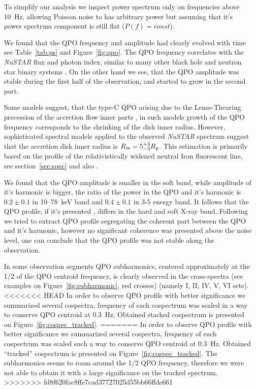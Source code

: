 \documentclass[a4paper,fleqn,usenatbib]{mnras}
\begin{document}
To simplify our analysis we inspect power spectrum only on frequencies above 10~Hz, allowing Poisson noise to has arbitrary power but assuming that it's power spectrum component is still flat ($P(f) = const$).

We found that the QPO frequency and amplitude had clearly evolved with time see Table~\ref{tab:ps} and Figure~\ref{fig:qpo}.
The QPO frequency correlates with the {\it NuSTAR} flux and photon index, similar to many other black hole and neutron star binary systems \citep[see, e.g.,][]{2003A&A...397..729V,2003A&A...407.1039P}.
On the other hand we see, that the QPO amplitude was stable during the first half of the observation, and started to grow in the second part.

Some models suggest, that the type-C QPO arising due to the Lense-Thearing precession of the accretion flow inner parts \citep{1998ApJ...492L..59S, 2006ApJ...642..420S, 2009MNRAS.397L.101I}, in such models growth of the QPO frequency corresponds to the shrinking of the disk inner radius.
However, sophisticated spectral models applied to the observed {\it NuSTAR} spectrum suggest that the accretion disk inner radius is $R_{\rm in}= 5_{-3}^{+3}R_{\rm g}$.
This estimation is primarily based on the profile of the relativistically widened neutral Iron fluorescent line, see section~\ref{sec:spec} and also \citep{miller15_nust}.

We found that the QPO amplitude is smaller in the soft band, while amplitude of it's harmonic is bigger, the ratio of the power in the QPO and it's harmonic is $0.2\pm0.1$ in 10--78~keV band and $0.4\pm0.1$ in 3-5 energy band.
It follows that the QPO profile, if it's presented \citep[see, e.g.][]{2015MNRAS.446.3516I}, differs in the hard and soft X-ray band.
Following \citep{2015MNRAS.446.3516I} we tried to extract  QPO profile segregating the coherent part between the QPO and it's harmonic, however no significant coherence was presented above the noise level, one can conclude that the QPO profile was not stable along the observation. 

In some observation segments QPO subharmonics, centered approximately at the 1/2 of the QPO centroid frequency, is clearly observed in the cross-spectra (see examples on Figure~\ref{fig:subharmonic}, red crosses) (namely I, II, IV, V, VI sets).
<<<<<<< HEAD
In order to observe QPO profile with better significance we summarized several cospectra, frequency of each cospectrum was scaled in a way to conserve QPO centroid at 0.3~Hz.
Obtained stacked cospectrum is presented on Figure~\ref{fig:cospec_tracked}.
=======
In order to observe QPO profile with better significance we summarized several cospectra, frequency of each cospectrum was scaled such a way to conserve QPO centroid at 0.3~Hz.
Obtained ``tracked'' cospectrum is presented on Figure~\ref{fig:cospec_tracked}.
The subharmonics seems to roam around the 1/2 QPO frequency, therefore we were not able to obtain it with a large significance on the tracked spectrum.
>>>>>>> fd8f620fac8ffe7cad37727025d55bb66ffde661
\end{document}
